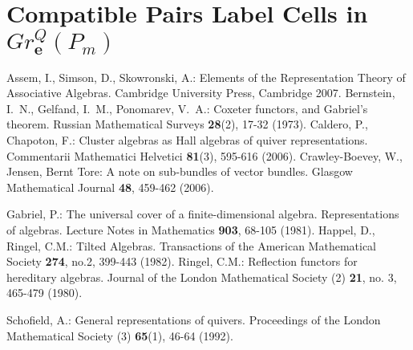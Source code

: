 \documentclass{amsart}
\newcommand{\bfe}{\mathbf{e}}
\begin{document}
\section{Compatible Pairs Label Cells in $Gr^Q_\bfe(P_m)$}
\begin{thebibliography}{10}
Assem, I., Simson, D., Skowronski, A.: Elements of the Representation Theory of Associative Algebras. Cambridge University Press, Cambridge 2007.
Bernstein, I.~N., Gelfand, I.~M., Ponomarev, V.~A.: Coxeter functors, and Gabriel's theorem. Russian Mathematical Surveys \textbf{28}(2), 17-32 (1973).
Caldero, P., Chapoton, F.: Cluster algebras as {H}all algebras of quiver representations.
Commentarii Mathematici Helvetici \textbf{81}(3), 595-616 (2006).
 Crawley-Boevey, W., Jensen, Bernt Tore: A note on sub-bundles of vector bundles. Glasgow Mathematical Journal \textbf{48}, 459-462 (2006).

 Gabriel, P.: The universal cover of a finite-dimensional algebra. Representations of algebras. Lecture Notes in Mathematics {\bf 903}, 68-105 (1981).
 Happel, D., Ringel, C.M.: Tilted Algebras. Transactions of the American Mathematical Society {\bf 274}, no.2, 399-443 (1982).
 Ringel, C.M.: Reflection functors for hereditary algebras. Journal of the London Mathematical Society (2) {\bf 21}, no. 3, 465-479 (1980).

 Schofield, A.: General representations of quivers. Proceedings of the London Mathematical Society (3) \textbf{65}(1), 46-64 (1992).

\end{thebibliography}
\end{document}
